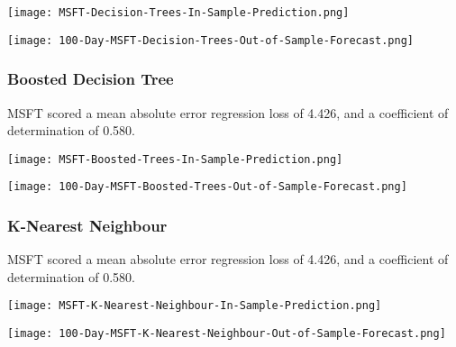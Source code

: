 \begin{center}
    \texttt{[image: MSFT-Decision-Trees-In-Sample-Prediction.png]}
    \label{fig:nonfloat}
\end{center}

\begin{center}  
    \texttt{[image: 100-Day-MSFT-Decision-Trees-Out-of-Sample-Forecast.png]}
    \label{fig:nonfloat}
\end{center}

\subsubsection{Boosted Decision Tree}
MSFT scored a mean absolute error regression loss of 4.426, and a coefficient of determination of 0.580.

\begin{center}
    \texttt{[image: MSFT-Boosted-Trees-In-Sample-Prediction.png]}
    \label{fig:nonfloat}
\end{center}

\begin{center}  
    \texttt{[image: 100-Day-MSFT-Boosted-Trees-Out-of-Sample-Forecast.png]}
    \label{fig:nonfloat}
\end{center}

\subsubsection{K-Nearest Neighbour}
MSFT scored a mean absolute error regression loss of 4.426, and a coefficient of determination of 0.580.

\begin{center}
    \texttt{[image: MSFT-K-Nearest-Neighbour-In-Sample-Prediction.png]}
    \label{fig:nonfloat}
\end{center}

\begin{center}  
    \texttt{[image: 100-Day-MSFT-K-Nearest-Neighbour-Out-of-Sample-Forecast.png]}
    \label{fig:nonfloat}
\end{center}

